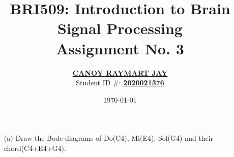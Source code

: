 \documentclass[a4paper, 12pt]{article}
\begin{document}
\title{BRI509: Introduction to Brain Signal Processing \\ Assignment No. 3}
\author{\underline{\textbf{CANOY RAYMART JAY}} \\ Student ID \#: \underline{\textbf{2020021376}}}
\date{\today}
\maketitle

\begin{itemize}
\item[(a)]{Draw the Bode diagrams of Do(C4), Mi(E4), Sol(G4) and their chord(C4+E4+G4).}

\begin{tcolorbox}[enforce breakable, pad at break = 1mm, break at=17cm,title={Source Code}]

\end{tcolorbox}
\end{itemize}
\end{document}
